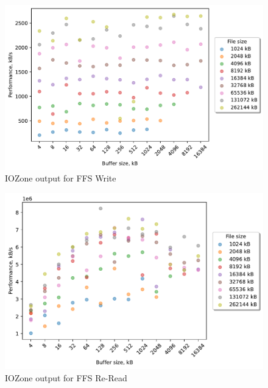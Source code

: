 \begin{figure}[!htb]
	\label{fig:bench_ffs_write}
	\begin{center}
		\includegraphics[width=1.0\textwidth]{figures/benchmarking/ffs/Write.pdf}
	\end{center}
	\caption{IOZone output for FFS Write}
\end{figure}

\begin{figure}[!htb]
	\label{fig:bench_ffs_re_read}
	\begin{center}
		\includegraphics[width=1.0\textwidth]{figures/benchmarking/ffs/Re-Read.pdf}
	\end{center}
	\caption{IOZone output for FFS \mbox{Re-Read}}
\end{figure}

